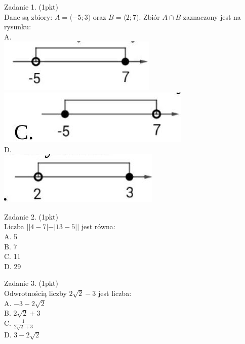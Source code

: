 \documentclass[10pt]{article}
\begin{document}
Zadanie 1. (1pkt)\\
Dane są zbiory: \(A=\langle-5 ; 3)\) oraz \(B=\langle 2 ; 7)\). Zbiór \(A \cap B\) zaznaczony jest na rysunku:\\
A.\\
\includegraphics[max width=\textwidth, center]{2024_11_21_55bf50695fa934dbe20eg-02(2)}\\
\includegraphics[max width=\textwidth, center]{2024_11_21_55bf50695fa934dbe20eg-02}\\
D.\\
\includegraphics[max width=\textwidth, center]{2024_11_21_55bf50695fa934dbe20eg-02(1)}

Zadanie 2. (1pkt)\\
Liczba \(||4-7|-|13-5||\) jest równa:\\
A. 5\\
B. 7\\
C. 11\\
D. 29

Zadanie 3. (1pkt)\\
Odwrotnością liczby \(2 \sqrt{2}-3\) jest liczba:\\
A. \(-3-2 \sqrt{2}\)\\
B. \(2 \sqrt{2}+3\)\\
C. \(\frac{1}{2 \sqrt{2}+3}\)\\
D. \(3-2 \sqrt{2}\)
\end{document}
